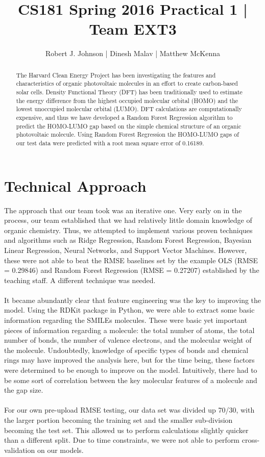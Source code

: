 \documentclass{article}
\begin{document}
\title{CS181 Spring 2016 Practical 1 | Team EXT3}
\author{Robert J. Johnson | Dinesh Malav | Matthew McKenna}



\maketitle

\begin{abstract}
The Harvard Clean Energy Project has been investigating the features and characteristics of organic photovoltaic molecules in an effort to create carbon-based solar cells. Density Functional Theory (DFT) has been traditionally used to estimate the energy difference from the highest occupied molecular orbital (HOMO) and the lowest unoccupied molecular orbital (LUMO). DFT calculations are computationally expensive, and thus we have developed a Random Forest Regression algorithm to predict the HOMO-LUMO gap based on the simple chemical structure of an organic photovoltaic molecule. Using Random Forest Regression the HOMO-LUMO gaps of our test data were predicted with a root mean square error of 0.16189. 
\end{abstract}

\section{Technical Approach}
The approach that our team took was an iterative one. Very early on in the process, our team established that we had relatively little domain knowledge of organic chemistry. Thus, we attempted to implement various proven techniques and algorithms such as Ridge Regression, Random Forest Regression, Bayesian Linear Regression, Neural Networks, and Support Vector Machines. However, these were not able to beat the RMSE baselines set by the example OLS (RMSE = 0.29846) and Random Forest Regression (RMSE = 0.27207) established by the teaching staff. A different technique was needed.\\\\
It became abundantly clear that feature engineering was the key to improving the model. Using the RDKit package in Python, we were able to extract some basic information regarding the SMILEs molecules. These were basic yet important pieces of information regarding a molecule: the total number of atoms, the total number of bonds, the number of valence electrons, and the molecular weight of the molecule. Undoubtedly, knowledge of specific types of bonds and chemical rings may have improved the analysis here, but for the time being, these factors were determined to be enough to improve on the model. Intuitively, there had to be some sort of correlation between the key molecular features of a molecule and the gap size.\\\\
For our own pre-upload RMSE testing, our data set was divided up 70/30, with the larger portion becoming the training set and the smaller sub-division becoming the test set. This allowed us to perform calculations slightly quicker than a different split. Due to time constraints, we were not able to perform cross-validation on our models. 
\end{document}

